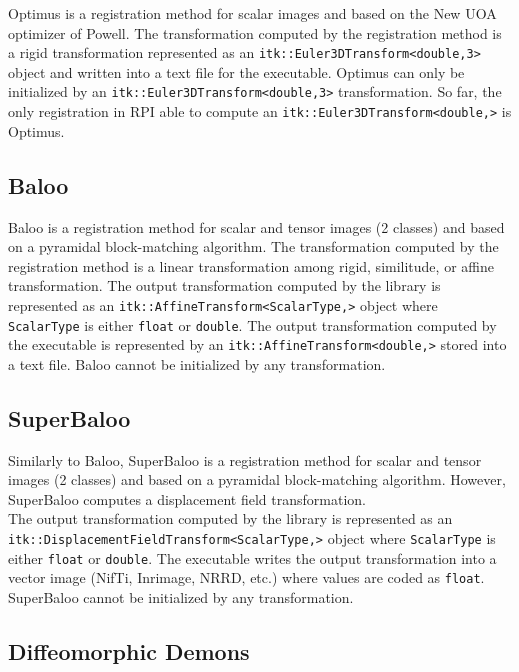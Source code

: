 Optimus is a registration method for scalar images and based on the New UOA optimizer of Powell. The transformation computed by the registration method is a rigid transformation represented as an \texttt{itk::Euler3DTransform<double,3>} object and written into a text file for the executable. Optimus can only be initialized by an \texttt{itk::Euler3DTransform<double,3>} transformation. So far, the only registration in RPI able to compute an \texttt{itk::\-Euler3D\-Transform\-<double,>} is Optimus.



\subsection{Baloo}

Baloo is a registration method for scalar and tensor images (2 classes) and based on a pyramidal block-matching algorithm. The transformation computed by the registration method is a linear transformation among rigid, similitude, or affine transformation. The output transformation computed by the library is represented as an \texttt{itk::\-Affine\-Transform\-<ScalarType,>} object where \texttt{ScalarType} is either \texttt{float} or \texttt{double}. The output transformation computed by the executable is represented by an \texttt{itk::\-Affine\-Transform\-<double,>} stored into a text file. Baloo cannot be initialized by any transformation.



\subsection{SuperBaloo}

Similarly to Baloo, SuperBaloo  is a registration method for scalar and tensor images (2 classes) and based on a pyramidal block-matching algorithm. However, SuperBaloo computes a displacement field transformation.
\\
The output transformation computed by the library is represented as an \texttt{itk::\-Displacement\-Field\-Transform\-<ScalarType,>} object where \texttt{ScalarType} is either \texttt{float} or \texttt{double}. The executable writes the output transformation into a vector image (NifTi, Inrimage, NRRD, etc.) where values are coded as \texttt{float}. SuperBaloo cannot be initialized by any transformation.



\subsection{Diffeomorphic Demons}

